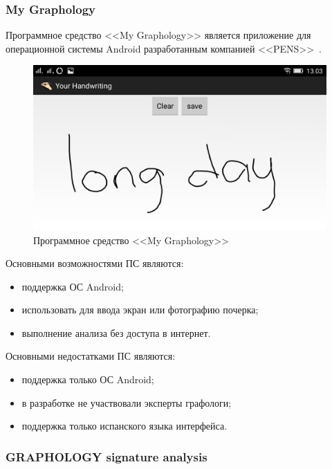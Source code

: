 \subsubsection{My Graphology}
\label{sub:domain:analogs:my_graphology}

Программное средство <<My Graphology>> является приложение для операционной системы Android разработанным компанией <<PENS>>~\cite{analogs_my_graphology}.

\begin{figure}[h]
    \centering
    \label{fig:domain:analogs:my_graphology}
    \includegraphics[width=0.4\textheight]{figures/analog_my_graphology.jpeg}
    \caption{Программное средство <<My Graphology>>}
\end{figure}

Основными возможностями ПС являются:
\begin{itemize}
  \item поддержка ОС Android;
  \item использовать для ввода экран или фотографию почерка;
  \item выполнение анализа без доступа в интернет.
\end{itemize}

Основными недостатками ПС являются:
\begin{itemize}
  \item поддержка только ОС Android;
  \item в разработке не участвовали эксперты графологи;
  \item поддержка только испанского языка интерфейса.
\end{itemize}

\subsubsection{GRAPHOLOGY signature analysis}
\label{sub:domain:analogs:graphology_sign_analysis}

